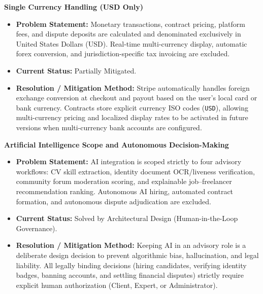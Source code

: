 \begin{description}[leftmargin=2.0cm,labelwidth=1.8cm,align=left,font=\normalfont\bfseries]
\item[LI-04] \textbf{Single Currency Handling (USD Only)}
\begin{itemize}[leftmargin=0.5cm, label=--]
\item \textbf{Problem Statement:} Monetary transactions, contract pricing, platform fees, and dispute deposits are calculated and denominated exclusively in United States Dollars (USD). Real-time multi-currency display, automatic forex conversion, and jurisdiction-specific tax invoicing are excluded.
\item \textbf{Current Status:} Partially Mitigated.
\item \textbf{Resolution / Mitigation Method:} Stripe automatically handles foreign exchange conversion at checkout and payout based on the user's local card or bank currency. Contracts store explicit currency ISO codes (\texttt{USD}), allowing multi-currency pricing and localized display rates to be activated in future versions when multi-currency bank accounts are configured.
\end{itemize}

\item[LI-05] \textbf{Artificial Intelligence Scope and Autonomous Decision-Making}
\begin{itemize}[leftmargin=0.5cm, label=--]
\item \textbf{Problem Statement:} AI integration is scoped strictly to four advisory workflows: CV skill extraction, identity document OCR/liveness verification, community forum moderation scoring, and explainable job--freelancer recommendation ranking. Autonomous AI hiring, automated contract formation, and autonomous dispute adjudication are excluded.
\item \textbf{Current Status:} Solved by Architectural Design (Human-in-the-Loop Governance).
\item \textbf{Resolution / Mitigation Method:} Keeping AI in an advisory role is a deliberate design decision to prevent algorithmic bias, hallucination, and legal liability. All legally binding decisions (hiring candidates, verifying identity badges, banning accounts, and settling financial disputes) strictly require explicit human authorization (Client, Expert, or Administrator).
\end{itemize}


\end{description}
